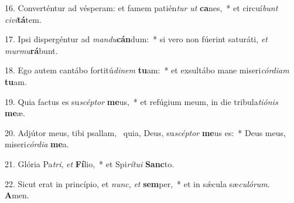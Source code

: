 16. Converténtur ad vésperam: et famem patién\textit{tur} \textit{ut} \textbf{ca}nes,~*  et circuí\textit{bunt} \textit{ci}\textit{vi}\textbf{tá}tem.\

17. Ipsi dispergéntur ad \textit{man}\textit{du}\textbf{cán}dum:~*  si vero non fúerint saturáti, \textit{et} \textit{mur}\textit{mu}\textbf{rá}bunt.\

18. Ego autem cantábo fortitú\textit{di}\textit{nem} \textbf{tu}am:~*  et exsultábo mane miseri\textit{cór}\textit{di}\textit{am} \textbf{tu}am.\

19. Quia factus es su\textit{scép}\textit{tor} \textbf{me}us,~*  et refúgium meum, in die tribula\textit{ti}\textit{ó}\textit{nis} \textbf{me}æ.\

20. Adjútor meus, tibi psallam, \dag\  quia, Deus, su\textit{scép}\textit{tor} \textbf{me}us es:~*  Deus meus, miseri\textit{cór}\textit{di}\textit{a} \textbf{me}a.\

21. Glória Pa\textit{tri}, \textit{et} \textbf{Fí}lio,~*  et Spi\textit{rí}\textit{tu}\textit{i} \textbf{Sanc}to.\

22. Sicut erat in princípio, et \textit{nunc}, \textit{et} \textbf{sem}per,~*  et in sǽcula sæ\textit{cu}\textit{ló}\textit{rum}. \textbf{A}men.\


